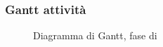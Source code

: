 \subsubsection{Gantt attività}
\begin{figure}[H]
\centering
{}
\caption{Diagramma di Gantt, fase di \AR}
\end{figure}

